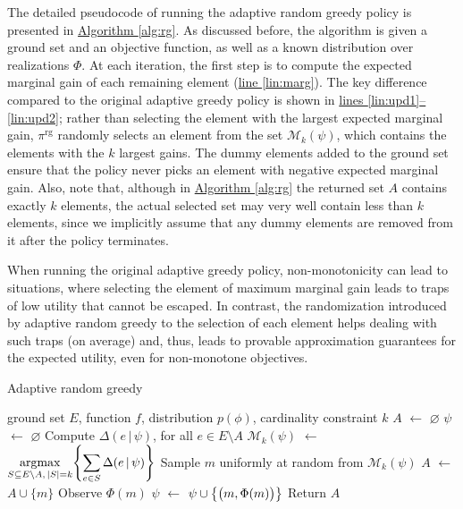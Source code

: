 \documentclass{article}
\newcommand{\algoref}[1]{\hyperref[#1]{Algorithm \ref*{#1}}}
\newcommand{\lineref}[1]{\hyperref[#1]{line \ref*{#1}}}
\newcommand{\linesref}[2]{\hyperref[#1]{lines \ref*{#1}--\ref*{#2}}}
\newcommand*\LET[2]{\STATE #1 $\gets$ #2}
\newcommand{\argmax}{\operatornamewithlimits{argmax}}
\let\originalleft\left
\let\originalright\right
\renewcommand{\left}{\mathopen{}\mathclose\bgroup\originalleft}
\renewcommand{\right}{\aftergroup\egroup\originalright}
\newcommand{\mmid}{\,\vert\,}
\newcommand{\D}[2]{\Delta(#1\mmid#2)}
\newcommand{\pig}{\pi^{\textrm{rg}}}
\newcommand{\Mk}{\mathcal{M}_k}
\begin{document}
The detailed pseudocode of running the adaptive random greedy policy is presented in \algoref{alg:rg}.
As discussed before, the algorithm is given a ground set and an objective function, as well as a known distribution over realizations $\Phi$.
At each iteration, the first step is to compute the expected marginal gain of each remaining element (\lineref{lin:marg}).
The key difference compared to the original adaptive greedy policy is shown in \linesref{lin:upd1}{lin:upd2}; rather than selecting the element with the largest expected marginal gain, $\pig$ randomly selects an element from the set $\Mk(\psi)$, which contains the elements with the $k$ largest gains.
The dummy elements added to the ground set ensure that the policy never picks an element with negative expected marginal gain.
Also, note that, although in \algoref{alg:rg} the returned set $A$ contains exactly $k$ elements, the actual selected set may very well contain less than $k$ elements, since we implicitly assume that any dummy elements are removed from it after the policy terminates.

When running the original adaptive greedy policy, non-monotonicity can lead to situations, where selecting the element of maximum marginal gain leads to traps of low utility that cannot be escaped.
In contrast, the randomization introduced by adaptive random greedy to the selection of each element helps dealing with such traps (on average) and, thus, leads to provable approximation guarantees for the expected utility, even for non-monotone objectives.

\begin{algorithm}[tb]
  \caption{Adaptive random greedy}
  \label{alg:rg}
  \small{
    \begin{algorithmic}[1]
      \REQUIRE ground set $E$, function $f$, distribution $p(\phi)$, cardinality constraint $k$
      \LET{$A$}{$\varnothing$}
      \LET{$\psi$}{$\varnothing$}
      \STATE Compute $\D{e}{\psi}$, for all $e \in E \setminus A$ \label{lin:marg}
      \LET{$\Mk(\psi)$}{$\displaystyle\argmax_{S \subseteq E \setminus A,\,|S| = k}\left\{\sum_{e \in S} \D{e}{\psi} \right\}$} \label{lin:upd1}
      \STATE Sample $m$ uniformly at random from $\Mk(\psi)$ \label{lin:upd2}
      \LET{$A$}{$A \cup \{m\}$}
      \STATE Observe $\Phi(m)$
      \LET{$\psi$}{$\psi \cup \left\{\big(m, \Phi(m)\big)\right\}$}
      \ENDFOR
      \STATE Return $A$
    \end{algorithmic}
  }
\end{algorithm}
\end{document}
